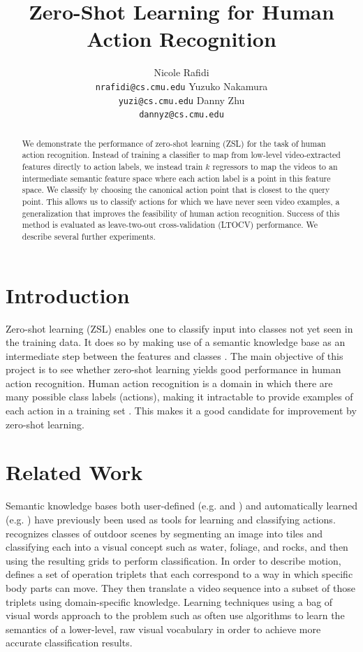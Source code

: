 \documentclass{article}
\title{Zero-Shot Learning for Human Action Recognition}
\author{Nicole Rafidi \\
  \texttt{nrafidi@cs.cmu.edu}
  \And
  Yuzuko Nakamura \\
  \texttt{yuzi@cs.cmu.edu}
  \And
  Danny Zhu \\
  \texttt{dannyz@cs.cmu.edu}
}
\begin{document}
\maketitle
\begin{abstract}
We demonstrate the performance of zero-shot learning (ZSL) for the task of human action recognition. Instead of training a classifier to map from low-level video-extracted features directly to action labels, we instead train $k$ regressors to map the videos to an intermediate semantic feature space where each action label is a point in this feature space. We classify by choosing the canonical action point that is closest to the query point.  This allows us to classify actions for which we have never seen video examples, a generalization that improves the feasibility of human action recognition. Success of this method is evaluated as leave-two-out cross-validation (LTOCV) performance. We describe several further experiments.
\end{abstract}
\section{Introduction}
Zero-shot learning (ZSL) enables one to classify input into classes not yet seen in the training data. It does so by making use of a semantic knowledge base as an intermediate step between the features and classes \cite{Palatucci09}. The main objective of this project is to see whether zero-shot learning yields good performance in human action recognition. Human action recognition is a domain in which there are many possible class labels (actions), making it intractable to provide examples of each action in a training set \cite{Poppe10}. This makes it a good candidate for improvement by zero-shot learning.

\section{Related Work}

Semantic knowledge bases both user-defined (e.g. \cite{Vogel07} and \cite{Park04}) and automatically learned (e.g. \cite{Zhao10}) have previously been used as tools for learning and classifying actions. \cite{Vogel07} recognizes classes of outdoor scenes by segmenting an image into tiles and classifying each into a visual concept such as water, foliage, and rocks, and then using the resulting grids to perform classification. In order to describe motion, \cite{Park04} defines a set of operation triplets that each correspond to a way in which specific body parts can move. They then translate a video sequence into a subset of those triplets using domain-specific knowledge. Learning techniques using a bag of visual words approach to the problem such as \cite{Zhao10} often use algorithms to learn the semantics of a lower-level, raw visual vocabulary in order to achieve more accurate classification results.
\end{document}
